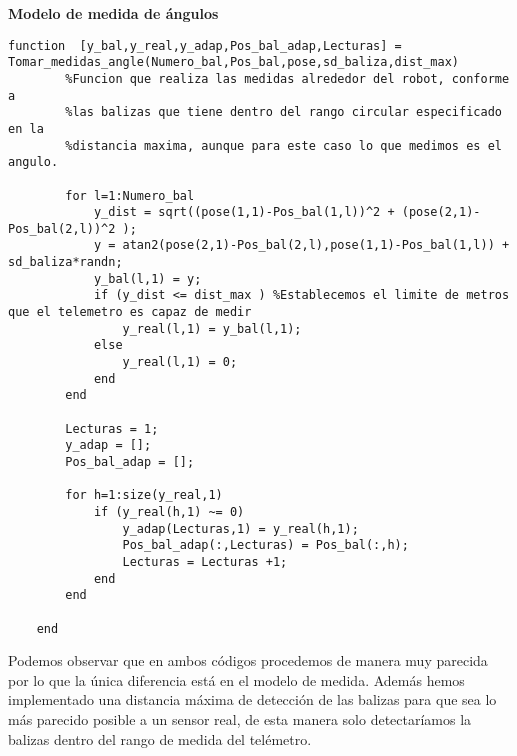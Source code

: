 \textbf{Modelo de medida de ángulos}
\begin{lstlisting}[frame=single]
function  [y_bal,y_real,y_adap,Pos_bal_adap,Lecturas] = Tomar_medidas_angle(Numero_bal,Pos_bal,pose,sd_baliza,dist_max)
        %Funcion que realiza las medidas alrededor del robot, conforme a
        %las balizas que tiene dentro del rango circular especificado en la
        %distancia maxima, aunque para este caso lo que medimos es el angulo.
        
        for l=1:Numero_bal
            y_dist = sqrt((pose(1,1)-Pos_bal(1,l))^2 + (pose(2,1)-Pos_bal(2,l))^2 );
            y = atan2(pose(2,1)-Pos_bal(2,l),pose(1,1)-Pos_bal(1,l)) + sd_baliza*randn;
            y_bal(l,1) = y;
            if (y_dist <= dist_max ) %Establecemos el limite de metros que el telemetro es capaz de medir
                y_real(l,1) = y_bal(l,1);
            else
                y_real(l,1) = 0;
            end
        end
        
        Lecturas = 1;
        y_adap = [];
        Pos_bal_adap = [];
        
        for h=1:size(y_real,1)
            if (y_real(h,1) ~= 0)
                y_adap(Lecturas,1) = y_real(h,1);
                Pos_bal_adap(:,Lecturas) = Pos_bal(:,h);
                Lecturas = Lecturas +1;
            end
        end
            
    end
\end{lstlisting}
Podemos observar que en ambos códigos procedemos de manera muy parecida por lo que la única diferencia está en el modelo de medida.
Además hemos implementado una distancia máxima de detección de las balizas para que sea lo más parecido posible a un sensor real, de esta manera solo detectaríamos la balizas dentro del rango de medida del telémetro.

